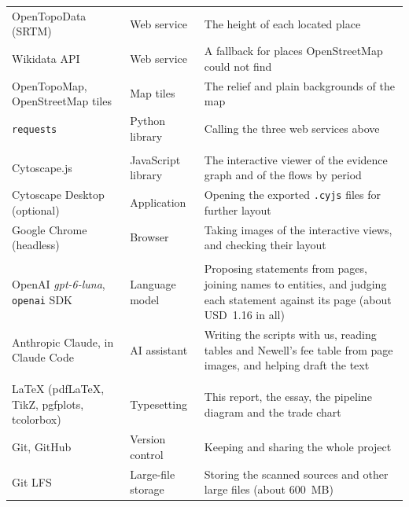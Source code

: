 \documentclass[10pt,a4paper,twocolumn]{article}
\begin{document}
{\begin{tabularx}{\textwidth}{@{}>{\raggedright\arraybackslash}p{3.6cm}>{\raggedright\arraybackslash}p{2.8cm}>{\raggedright\arraybackslash}X@{}}
OpenTopoData (SRTM) & Web service & The height of each located place\\
Wikidata API & Web service & A fallback for places OpenStreetMap could not find\\
OpenTopoMap, OpenStreetMap tiles & Map tiles & The relief and plain backgrounds of the map\\
\texttt{requests} & Python library & Calling the three web services above\\
\midrule
\multicolumn{3}{@{}l}{\sffamily\bfseries\color{maroon}Viewing the graph}\\
Cytoscape.js & JavaScript library & The interactive viewer of the evidence graph and of the flows by period\\
Cytoscape Desktop (optional) & Application & Opening the exported \texttt{.cyjs} files for further layout\\
Google Chrome (headless) & Browser & Taking images of the interactive views, and checking their layout\\
\midrule
\multicolumn{3}{@{}l}{\sffamily\bfseries\color{maroon}AI}\\
OpenAI \emph{gpt-6-luna}, \texttt{openai} SDK & Language model & Proposing statements from pages, joining names to entities, and judging each statement against its page (about USD~1.16 in all)\\
Anthropic Claude, in Claude Code & AI assistant & Writing the scripts with us, reading tables and Newell's fee table from page images, and helping draft the text\\
\midrule
\multicolumn{3}{@{}l}{\sffamily\bfseries\color{maroon}Writing and sharing}\\
\LaTeX{} (pdfLaTeX, TikZ, pgfplots, tcolorbox) & Typesetting & This report, the essay, the pipeline diagram and the trade chart\\
Git, GitHub & Version control & Keeping and sharing the whole project\\
Git LFS & Large-file storage & Storing the scanned sources and other large files (about 600~MB)\\
\bottomrule
\end{tabularx}}
\end{document}
